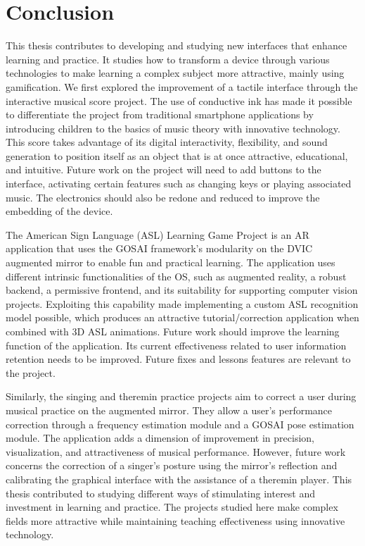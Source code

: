 \chapter{Conclusion}
 

This thesis contributes to developing and studying new interfaces that enhance learning and practice. It studies how to transform a device through various technologies to make learning a complex subject more attractive, mainly using gamification. We first explored the improvement of a tactile interface through the interactive musical score project. The use of conductive ink has made it possible to differentiate the project from traditional smartphone applications by introducing children to the basics of music theory with innovative technology. This score takes advantage of its digital interactivity, flexibility, and sound generation to position itself as an object that is at once attractive, educational, and intuitive. Future work on the project will need to add buttons to the interface, activating certain features such as changing keys or playing associated music. The electronics should also be redone and reduced to improve the embedding of the device. 

The American Sign Language (ASL) Learning Game Project is an AR application that uses the GOSAI framework's modularity on the DVIC augmented mirror to enable fun and practical learning. The application uses different intrinsic functionalities of the OS, such as augmented reality, a robust backend, a permissive frontend, and its suitability for supporting computer vision projects. Exploiting this capability made implementing a custom ASL recognition model possible, which produces an attractive tutorial/correction application when combined with 3D ASL animations. Future work should improve the learning function of the application. Its current effectiveness related to user information retention needs to be improved. Future fixes and lessons features are relevant to the project. 

Similarly, the singing and theremin practice projects aim to correct a user during musical practice on the augmented mirror. They allow a user's performance correction through a frequency estimation module and a GOSAI pose estimation module. The application adds a dimension of improvement in precision, visualization, and attractiveness of musical performance. However, future work concerns the correction of a singer's posture using the mirror's reflection and calibrating the graphical interface with the assistance of a theremin player. This thesis contributed to studying different ways of stimulating interest and investment in learning and practice. The projects studied here make complex fields more attractive while maintaining teaching effectiveness using innovative technology.

